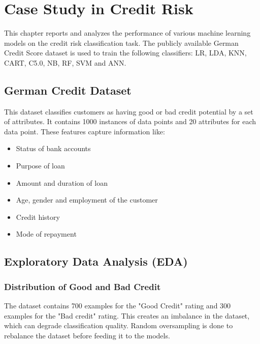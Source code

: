 \documentclass[a4paper, 12pt]{article}
\begin{document}
\newpage
\section{\centering Case Study in Credit Risk}
\vskip 0.25in
This chapter reports and analyzes the performance of various machine learning models on the credit risk classification task. The publicly available German Credit Score dataset is used to train the following classifiers: LR, LDA, KNN, CART, C5.0, NB, RF, SVM and ANN.

\vskip 0.2in
\subsection{German Credit Dataset}
This dataset classifies customers as having good or bad credit potential by a set of attributes. It contains 1000 instances of data points and 20 attributes for each data point. These features capture information like:
\begin{itemize}
  \item Status of bank accounts
  \item Purpose of loan
  \item Amount and duration of loan
  \item Age, gender and employment of the customer
  \item Credit history
  \item Mode of repayment
\end{itemize}

\vskip 0.2in
\subsection{Exploratory Data Analysis (EDA)}
\subsubsection{Distribution of Good and Bad Credit}
\noindent The dataset contains 700 examples for the "Good Credit" rating and 300 examples for the "Bad credit" rating. This creates an imbalance in the dataset, which can degrade classification quality. Random oversampling is done to rebalance the dataset before feeding it to the models. \cite{japkowicz2002class}
\end{document}
